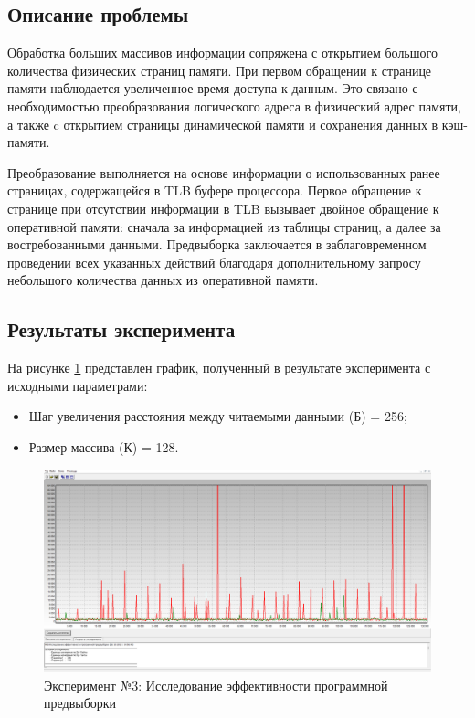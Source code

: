 \subsection*{Описание проблемы}
Обработка больших массивов информации сопряжена с открытием большого количества физических страниц памяти. При первом обращении к странице памяти наблюдается увеличенное время доступа к данным. Это связано с необходимостью преобразования логического адреса в физический адрес памяти, а также c открытием страницы динамической памяти и сохранения данных в кэш-памяти.

Преобразование выполняется на основе информации о использованных ранее страницах, содержащейся в TLB буфере процессора. Первое обращение к странице при отсутствии информации в TLB вызывает двойное обращение к оперативной памяти: сначала за информацией из таблицы страниц, а далее за востребованными данными. Предвыборка заключается в заблаговременном проведении всех указанных действий благодаря дополнительному запросу небольшого количества данных из оперативной памяти. 

\subsection*{Результаты эксперимента}

На рисунке \ref{ex:t3} представлен график, полученный в результате эксперимента с исходными параметрами:
\begin{itemize}
	\item Шаг увеличения расстояния между читаемыми данными (Б) = 256;
	\item Размер массива (К) = 128.
\end{itemize}

\begin{figure}[h]
	\centering
	\includegraphics[height=0.35\textheight]{img/t3}
	\caption{Эксперимент №3: Исследование эффективности программной предвыборки}
	\label{ex:t3}
\end{figure}

